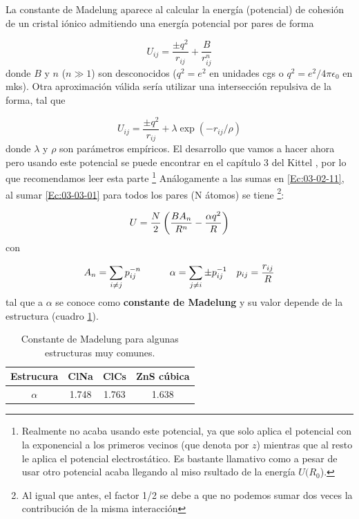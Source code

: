 La constante de Madelung aparece al calcular la energía (potencial) de cohesión de un cristal iónico admitiendo una energía potencial por pares de forma 

\begin{equation}
    U_{ij} = \frac{\pm q^2}{r_{ij}} + \frac{B}{r_{ij}^n} \label{Ec:03-03-01}
\end{equation} 
donde $B$ y $n$ ($n\gg 1$) son desconocidos ($q^2 = e^2$ en unidades cgs o $q^2=e^2 / 4 \pi \epsilon_0$ en mks). Otra aproximación válida sería utilizar una intersección repulsiva de la forma, tal que 

\begin{equation*}
	U_{ij} = \frac{\pm q^2}{r_{ij}} + \lambda \exp(-r_{ij}/\rho) 
\end{equation*} 
donde $\lambda$ y $\rho$ son parámetros empíricos. El desarrollo que vamos a hacer ahora pero usando este potencial se puede encontrar en el capítulo 3 del Kittel \cite{Estado_Solido_Kittel}, por lo que recomendamos leer esta parte \footnote{Realmente no acaba usando este potencial, ya que solo aplica el potencial con la exponencial a los primeros vecinos (que denota por $z$) mientras que al resto le aplica el potencial electrostático. Es bastante llamativo como a pesar de usar otro potencial acaba llegando al miso rsultado de la energía $U(R_0$).} Análogamente a las sumas en \ref{Ec:03-02-11}, al sumar \ref{Ec:03-03-01} para todos los pares (N átomos) se tiene \footnote{Al igual que antes, el factor 1/2 se debe a que no podemos sumar dos veces la contribución de la misma interacción}:

\begin{equation}
    U = \frac{N}{2} \left( \frac{BA_n}{R^n}-\frac{\alpha q^2}{R} \right)
\end{equation}
con 

\begin{equation}
    A_n = \sum_{i\neq j} p_{ij}^{-n} \quad \quad \quad \alpha = \sum_{j \neq i} \pm p_{ij}^{-1} \quad p_{ij} = \frac{r_{ij}}{R}
\end{equation}
tal que a $\alpha$ se conoce como \textbf{constante de Madelung} y su valor depende de la estructura (cuadro \ref{Tab:03-02}).

\begin{table}[h!] \centering
    \begin{tabular}{c|ccc}
        Estrucura & ClNa & ClCs & ZnS cúbica \\ \hline
        $\alpha$ & 1.748 & 1.763 & 1.638 
    \end{tabular}
    \caption{Constante de Madelung para algunas estructuras muy comunes.}
    \label{Tab:03-02}
\end{table}

